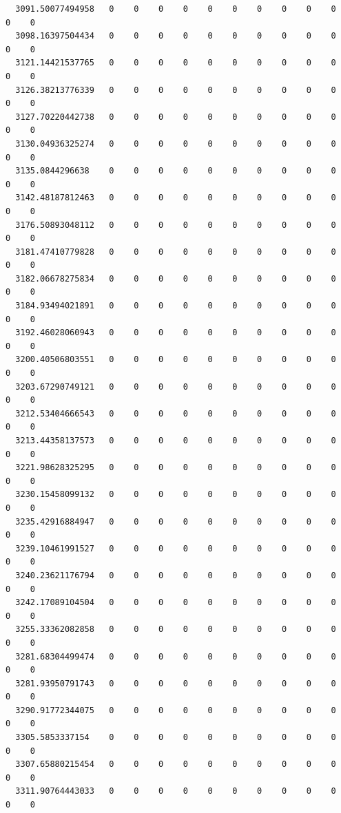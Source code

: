 \documentclass[
  letterpaper,
  DIV=11,
  numbers=noendperiod]{scrartcl}
\begin{document}
\begin{verbatim}
  3091.50077494958   0    0    0    0    0    0    0    0    0    0    0    0
  3098.16397504434   0    0    0    0    0    0    0    0    0    0    0    0
  3121.14421537765   0    0    0    0    0    0    0    0    0    0    0    0
  3126.38213776339   0    0    0    0    0    0    0    0    0    0    0    0
  3127.70220442738   0    0    0    0    0    0    0    0    0    0    0    0
  3130.04936325274   0    0    0    0    0    0    0    0    0    0    0    0
  3135.0844296638    0    0    0    0    0    0    0    0    0    0    0    0
  3142.48187812463   0    0    0    0    0    0    0    0    0    0    0    0
  3176.50893048112   0    0    0    0    0    0    0    0    0    0    0    0
  3181.47410779828   0    0    0    0    0    0    0    0    0    0    0    0
  3182.06678275834   0    0    0    0    0    0    0    0    0    0    0    0
  3184.93494021891   0    0    0    0    0    0    0    0    0    0    0    0
  3192.46028060943   0    0    0    0    0    0    0    0    0    0    0    0
  3200.40506803551   0    0    0    0    0    0    0    0    0    0    0    0
  3203.67290749121   0    0    0    0    0    0    0    0    0    0    0    0
  3212.53404666543   0    0    0    0    0    0    0    0    0    0    0    0
  3213.44358137573   0    0    0    0    0    0    0    0    0    0    0    0
  3221.98628325295   0    0    0    0    0    0    0    0    0    0    0    0
  3230.15458099132   0    0    0    0    0    0    0    0    0    0    0    0
  3235.42916884947   0    0    0    0    0    0    0    0    0    0    0    0
  3239.10461991527   0    0    0    0    0    0    0    0    0    0    0    0
  3240.23621176794   0    0    0    0    0    0    0    0    0    0    0    0
  3242.17089104504   0    0    0    0    0    0    0    0    0    0    0    0
  3255.33362082858   0    0    0    0    0    0    0    0    0    0    0    0
  3281.68304499474   0    0    0    0    0    0    0    0    0    0    0    0
  3281.93950791743   0    0    0    0    0    0    0    0    0    0    0    0
  3290.91772344075   0    0    0    0    0    0    0    0    0    0    0    0
  3305.5853337154    0    0    0    0    0    0    0    0    0    0    0    0
  3307.65880215454   0    0    0    0    0    0    0    0    0    0    0    0
  3311.90764443033   0    0    0    0    0    0    0    0    0    0    0    0
                  

\end{verbatim}
\end{document}

